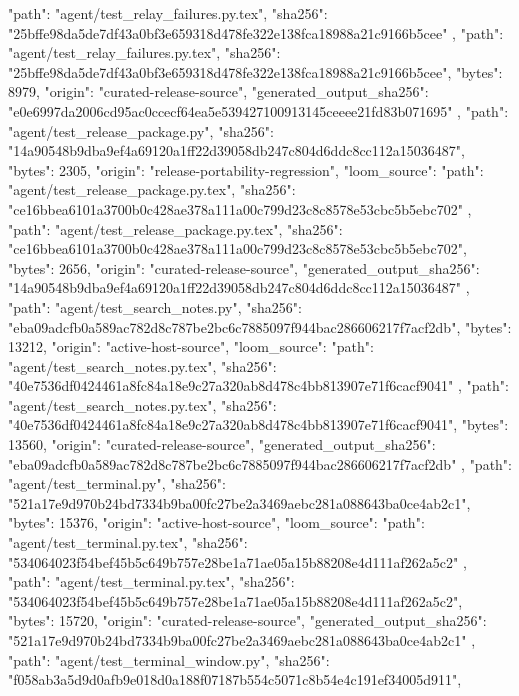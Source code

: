 {{{        "path": "agent/test_relay_failures.py.tex",
        "sha256": "25bffe98da5de7df43a0bf3e659318d478fe322e138fca18988a21c9166b5cee"
      }
    },
    {
      "path": "agent/test_relay_failures.py.tex",
      "sha256": "25bffe98da5de7df43a0bf3e659318d478fe322e138fca18988a21c9166b5cee",
      "bytes": 8979,
      "origin": "curated-release-source",
      "generated_output_sha256": "e0e6997da2006cd95ac0ccecf64ea5e539427100913145ceeee21fd83b071695"
    },
    {
      "path": "agent/test_release_package.py",
      "sha256": "14a90548b9dba9ef4a69120a1ff22d39058db247c804d6ddc8cc112a15036487",
      "bytes": 2305,
      "origin": "release-portability-regression",
      "loom_source": {
        "path": "agent/test_release_package.py.tex",
        "sha256": "ce16bbea6101a3700b0c428ae378a111a00c799d23c8c8578e53cbc5b5ebc702"
      }
    },
    {
      "path": "agent/test_release_package.py.tex",
      "sha256": "ce16bbea6101a3700b0c428ae378a111a00c799d23c8c8578e53cbc5b5ebc702",
      "bytes": 2656,
      "origin": "curated-release-source",
      "generated_output_sha256": "14a90548b9dba9ef4a69120a1ff22d39058db247c804d6ddc8cc112a15036487"
    },
    {
      "path": "agent/test_search_notes.py",
      "sha256": "eba09adcfb0a589ac782d8c787be2bc6c7885097f944bac286606217f7acf2db",
      "bytes": 13212,
      "origin": "active-host-source",
      "loom_source": {
        "path": "agent/test_search_notes.py.tex",
        "sha256": "40e7536df0424461a8fc84a18e9c27a320ab8d478c4bb813907e71f6cacf9041"
      }
    },
    {
      "path": "agent/test_search_notes.py.tex",
      "sha256": "40e7536df0424461a8fc84a18e9c27a320ab8d478c4bb813907e71f6cacf9041",
      "bytes": 13560,
      "origin": "curated-release-source",
      "generated_output_sha256": "eba09adcfb0a589ac782d8c787be2bc6c7885097f944bac286606217f7acf2db"
    },
    {
      "path": "agent/test_terminal.py",
      "sha256": "521a17e9d970b24bd7334b9ba00fc27be2a3469aebc281a088643ba0ce4ab2c1",
      "bytes": 15376,
      "origin": "active-host-source",
      "loom_source": {
        "path": "agent/test_terminal.py.tex",
        "sha256": "534064023f54bef45b5c649b757e28be1a71ae05a15b88208e4d111af262a5c2"
      }
    },
    {
      "path": "agent/test_terminal.py.tex",
      "sha256": "534064023f54bef45b5c649b757e28be1a71ae05a15b88208e4d111af262a5c2",
      "bytes": 15720,
      "origin": "curated-release-source",
      "generated_output_sha256": "521a17e9d970b24bd7334b9ba00fc27be2a3469aebc281a088643ba0ce4ab2c1"
    },
    {
      "path": "agent/test_terminal_window.py",
      "sha256": "f058ab3a5d9d0afb9e018d0a188f07187b554c5071c8b54e4c191ef34005d911",
}}
